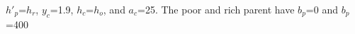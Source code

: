 $h'_p$=$h_r$, $y_c$=1.9, $h_c$=$h_o$, and $a_c$=25. The poor and rich parent have $b_p$=0 and $b_p$=400